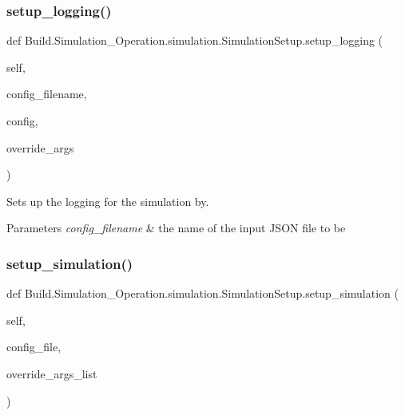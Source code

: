 \subsubsection{\texorpdfstring{setup\+\_\+logging()}{setup\_logging()}}
{\footnotesize\ttfamily def Build.\+Simulation\+\_\+\+Operation.\+simulation.\+Simulation\+Setup.\+setup\+\_\+logging (\begin{DoxyParamCaption}\item[{}]{self,  }\item[{}]{config\+\_\+filename,  }\item[{}]{config,  }\item[{}]{override\+\_\+args }\end{DoxyParamCaption})}



Sets up the logging for the simulation by. 


\begin{DoxyParams}{Parameters}
{\em config\+\_\+filename} & the name of the input J\+S\+ON file to be \\
\hline
\end{DoxyParams}
\mbox{\label{class_build_1_1_simulation___operation_1_1simulation_1_1_simulation_setup_ab84075cdf159c767ccfc52549c9578ce}} 
\subsubsection{\texorpdfstring{setup\+\_\+simulation()}{setup\_simulation()}}
{\footnotesize\ttfamily def Build.\+Simulation\+\_\+\+Operation.\+simulation.\+Simulation\+Setup.\+setup\+\_\+simulation (\begin{DoxyParamCaption}\item[{}]{self,  }\item[{}]{config\+\_\+file,  }\item[{}]{override\+\_\+args\+\_\+list }\end{DoxyParamCaption})}



